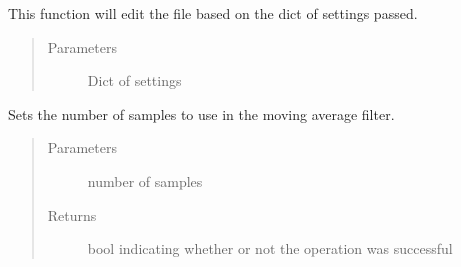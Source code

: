 \documentclass[letterpaper,10pt,english]{sphinxmanual}
\begin{document}

\begin{fulllineitems}
\label{\detokenize{settings_interface:settings_interface.save_plotting_configuration}}
This function will edit the file based on the dict of settings passed.
\begin{quote}\begin{description}
\item[{Parameters}] \leavevmode
{} \textendash{} Dict of settings

\end{description}\end{quote}

\end{fulllineitems}


\begin{fulllineitems}
\label{\detokenize{settings_interface:settings_interface.set_window_samples}}
Sets the number of samples to use in the moving average filter.
\begin{quote}\begin{description}
\item[{Parameters}] \leavevmode
{} \textendash{} number of samples

\item[{Returns}] \leavevmode
bool indicating whether or not the operation was successful

\end{description}\end{quote}

\end{fulllineitems}

\end{document}

